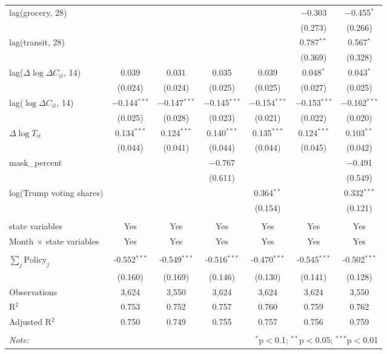 \begin{tabular}{@{\extracolsep{1pt}}lcccccc}
  lag(grocery, 28) &  &  &  &  & $-$0.303 & $-$0.455$^{*}$ \\ 
  &  &  &  &  & (0.273) & (0.266) \\ 
  lag(transit, 28) &  &  &  &  & 0.787$^{**}$ & 0.567$^{*}$ \\ 
  &  &  &  &  & (0.369) & (0.328) \\ 
  lag($\Delta \log \Delta C_{it}$, 14) & 0.039 & 0.031 & 0.035 & 0.039 & 0.048$^{*}$ & 0.043$^{*}$ \\ 
  & (0.024) & (0.024) & (0.025) & (0.025) & (0.027) & (0.025) \\ 
  lag($\log \Delta C_{it}$, 14) & $-$0.144$^{***}$ & $-$0.147$^{***}$ & $-$0.145$^{***}$ & $-$0.154$^{***}$ & $-$0.153$^{***}$ & $-$0.162$^{***}$ \\ 
  & (0.025) & (0.028) & (0.023) & (0.021) & (0.022) & (0.020) \\ 
  $\Delta \log T_{it}$ & 0.134$^{***}$ & 0.124$^{***}$ & 0.140$^{***}$ & 0.135$^{***}$ & 0.124$^{***}$ & 0.103$^{**}$ \\ 
  & (0.044) & (0.041) & (0.044) & (0.044) & (0.045) & (0.042) \\ 
  mask\_percent &  &  & $-$0.767 &  &  & $-$0.491 \\ 
  &  &  & (0.611) &  &  & (0.549) \\ 
  log(Trump voting shares) &  &  &  & 0.364$^{**}$ &  & 0.332$^{***}$ \\ 
  &  &  &  & (0.154) &  & (0.121) \\ 
 \hline \\[-1.8ex] 
state variables & Yes & Yes & Yes & Yes & Yes & Yes \\ 
Month $\times$ state variables & Yes & Yes & Yes & Yes & Yes & Yes \\ 
\hline \\[-1.8ex] 
$\sum_j \mathrm{Policy}_j$ & -0.552$^{***}$ & -0.549$^{***}$ & -0.516$^{***}$ & -0.470$^{***}$ & -0.545$^{***}$ & -0.502$^{***}$ \\ 
 & (0.160) & (0.169) & (0.146) & (0.130) & (0.141) & (0.128) \\ 
Observations & 3,624 & 3,550 & 3,624 & 3,624 & 3,624 & 3,550 \\ 
R$^{2}$ & 0.753 & 0.752 & 0.757 & 0.760 & 0.759 & 0.762 \\ 
Adjusted R$^{2}$ & 0.750 & 0.749 & 0.755 & 0.757 & 0.756 & 0.759 \\ 
\hline 
\hline \\[-1.8ex] 
\textit{Note:}  & \multicolumn{6}{r}{$^{*}$p$<$0.1; $^{**}$p$<$0.05; $^{***}$p$<$0.01} \\ 
\end{tabular} 